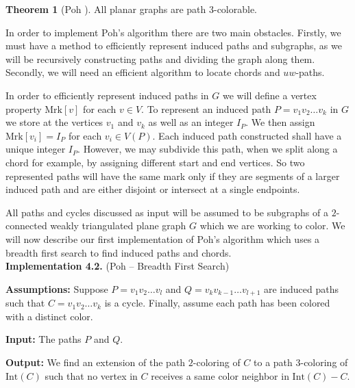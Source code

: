 \documentclass[letterpaper, 12pt]{amsart}
\theoremstyle{definition}
\theoremstyle{definition}
\theoremstyle{thm}
\newtheorem{theorem}{Theorem}[section]
\theoremstyle{definition}
\begin{document}
\begin{theorem}[Poh \cite{poh}]
All planar graphs are path $3$-colorable.
\end{theorem}

In order to implement Poh's algorithm there are two main obstacles. Firstly, we
must have a method to efficiently represent induced paths and subgraphs, as we
will be recursively constructing paths and dividing the graph along them.
Secondly, we will need an efficient algorithm to locate chords and $uw$-paths.

In order to efficiently represent induced paths in $G$ we will define a vertex
property $\text{Mrk}[v]$ for each $v\in V$. To represent an
induced path $P=v_1v_2\ldots v_k$ in $G$ we store at the vertices $v_1$ and
$v_k$ as well as an integer $I_P$. We then assign $\text{Mrk}[v_i]=I_P$ for
each $v_i\in V(P)$. Each induced path constructed shall have a unique integer
$I_P$. However, we may subdivide this path, when we split along a chord for
example, by assigning different start and end vertices. So two represented paths
will have the same mark only if they are segments of a larger induced path and
are either disjoint or intersect at a single endpoints.

All paths and cycles discussed as input will be assumed to be subgraphs of a
$2$-connected weakly triangulated plane graph $G$ which we are working to color.
We will now describe our first implementation of Poh's algorithm which uses a
breadth first search to find induced paths and chords.\\

\noindent\textbf{Implementation 4.2.} (Poh -- Breadth First Search)

\noindent\textbf{Assumptions:} Suppose $P=v_1v_2\ldots v_l$ and
$Q=v_kv_{k-1}\ldots v_{l+1}$ are induced
paths such that $C=v_1v_2\ldots v_k$ is a cycle. Finally, assume each
path has been colored with a distinct color.

\noindent\textbf{Input:} The paths $P$ and $Q$.

\noindent\textbf{Output:} We find an extension of the path $2$-coloring of $C$ to
a path $3$-coloring of $\text{Int}(C)$ such that
no vertex in $C$ receives a same color neighbor in $\text{Int}(C)-C$.
\end{document}

